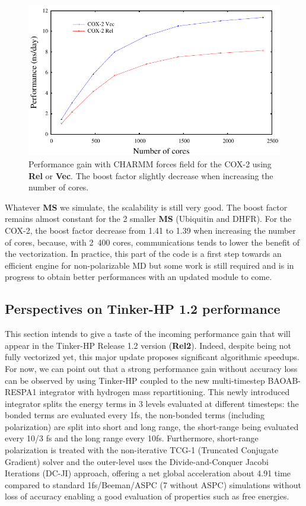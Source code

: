 \documentclass[9pt,comparison]{livecoms}
\begin{document}
\begin{figure}[htb!]
\centering
\includegraphics[scale=0.7]{cox.pdf}
\caption{Performance gain with CHARMM forces field for the COX-2 using \textbf{Rel} or \textbf{Vec}. The boost factor slightly decrease  when increasing the number of cores.}
\label{fig:cox2}
\end{figure}

Whatever \textbf{MS} we simulate, the scalability is still very good. The boost factor remains almost constant for the 2 smaller \textbf{MS} (Ubiquitin and DHFR). For the COX-2, the boost factor decrease from 1.41 to 1.39 when increasing the number of cores, because, with 2~400 cores, communications tends to lower the benefit of the vectorization. In practice, this part of the code is a first step towards an efficient engine for non-polarizable MD but some work is still required and is in progress to obtain better performances with an updated module to come. 


\subsection{Perspectives on Tinker-HP 1.2 performance} \label{subsection:Perspectives}
\hspace{\parindent}This section intends to give a taste of the incoming performance gain that will appear in the Tinker-HP Release 1.2 version (\textbf{Rel2}). Indeed, despite being not fully vectorized yet, this major update proposes significant algorithmic speedups.  For now, we can point out that a strong performance gain without accuracy loss can be observed by using Tinker-HP coupled to the new multi-timestep BAOAB-RESPA1 integrator\cite{baoab-respa1} with hydrogen mass repartitioning.
This newly introduced integrator splits the energy terms in 3 levels evaluated at different timesteps: the bonded terms are evaluated every 1fs, the non-bonded terms (including polarization) are split into short and long range, the short-range being evaluated every 10/3 fs and the long range every 10fs. Furthermore, short-range polarization is treated with the non-iterative TCG-1 (Truncated Conjugate Gradient) solver\cite{aviatjctc2017,aviatjpc2017} and the outer-level uses the Divide-and-Conquer Jacobi Iterations (DC-JI) \cite{Nocito2018} approach, offering a net global acceleration about 4.91 time compared to standard 1fs/Beeman/ASPC (7 without ASPC) simulations without loss of accuracy enabling a good evaluation of properties such as free energies\cite{baoab-respa1}.
\end{document}
